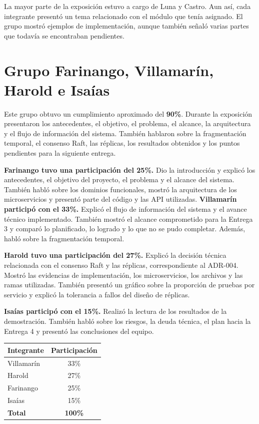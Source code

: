 \documentclass[12pt]{article}
\begin{document}
La mayor parte de la exposición estuvo a cargo de Luna y Castro. Aun así, cada integrante presentó un tema relacionado con el módulo que tenía asignado. El grupo mostró ejemplos de implementación, aunque también señaló varias partes que todavía se encontraban pendientes.


\section*{Grupo Farinango, Villamarín, Harold e Isaías}

Este grupo obtuvo un cumplimiento aproximado del \textbf{90\%}. Durante la exposición presentaron los antecedentes, el objetivo, el problema, el alcance, la arquitectura y el flujo de información del sistema. También hablaron sobre la fragmentación temporal, el consenso Raft, las réplicas, los resultados obtenidos y los puntos pendientes para la siguiente entrega.

\textbf{Farinango tuvo una participación del 25\%.} Dio la introducción y explicó los antecedentes, el objetivo del proyecto, el problema y el alcance del sistema. También habló sobre los dominios funcionales, mostró la arquitectura de los microservicios y presentó parte del código y las API utilizadas.
\newpage
\textbf{Villamarín participó con el 33\%.} Explicó el flujo de información del sistema y el avance técnico implementado. También mostró el alcance comprometido para la Entrega 3 y comparó lo planificado, lo logrado y lo que no se pudo completar. Además, habló sobre la fragmentación temporal.

\textbf{Harold tuvo una participación del 27\%.} Explicó la decisión técnica relacionada con el consenso Raft y las réplicas, correspondiente al ADR-004. Mostró las evidencias de implementación, los microservicios, los archivos y las ramas utilizadas. También presentó un gráfico sobre la proporción de pruebas por servicio y explicó la tolerancia a fallos del diseño de réplicas.

\textbf{Isaías participó con el 15\%.} Realizó la lectura de los resultados de la demostración. También habló sobre los riesgos, la deuda técnica, el plan hacia la Entrega 4 y presentó las conclusiones del equipo.

\begin{center}
\begin{tabular}{lc}
\toprule
\textbf{Integrante} & \textbf{Participación} \\
\midrule
Villamarín & 33\% \\
Harold & 27\% \\
Farinango & 25\% \\
Isaías & 15\% \\
\midrule
\textbf{Total} & \textbf{100\%} \\
\bottomrule
\end{tabular}
\end{center}
\end{document}
